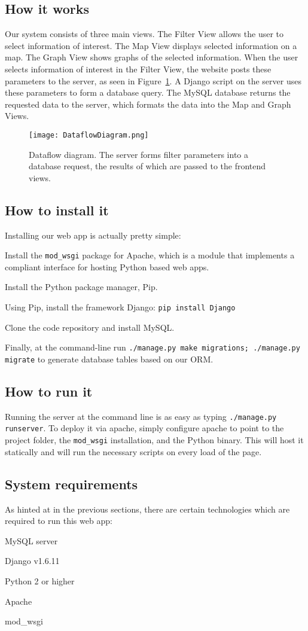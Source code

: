 \subsection{How it works}
Our system consists of three main views.
The Filter View allows the user to select information of interest.
The Map View displays selected information on a map.
The Graph View shows graphs of the selected information.
When the user selects information of interest in the Filter View, the website posts these parameters to the server, as seen in Figure~\ref{fig:dataflow}.
A Django script on the server uses these parameters to form a database query.
The MySQL database returns the requested data to the server, which formats the data into the Map and Graph Views.

\begin{figure}[h]
\centering
\texttt{[image: DataflowDiagram.png]}
\captionsetup{justification=centering}
\caption{
  Dataflow diagram.
  The server forms filter parameters into a database request, the results of which are passed to the frontend views.
}
\label{fig:dataflow}
\end{figure}

\subsection{How to install it}
Installing our web app is actually pretty simple:
\begin{list}{-}{}
\item Install the \texttt{mod\_wsgi} package for Apache, which is a module that implements a compliant interface for hosting Python based web apps.
\item Install the Python package manager, Pip.
\item Using Pip, install the framework Django: \texttt{pip install Django}
\item Clone the code repository and install MySQL.
\item Finally, at the command-line run \texttt{./manage.py make migrations; ./manage.py migrate} to generate database tables based on our ORM.
\end{list}

\subsection{How to run it}
Running the server at the command line is as easy as typing \texttt{./manage.py runserver}.
To deploy it via apache, simply configure apache to point to the project folder, the \texttt{mod\_wsgi} installation, and the Python binary.
This will host it statically and will run the necessary scripts on every load of the page.

\subsection{System requirements}
As hinted at in the previous sections, there are certain technologies which are required to run this web app:
\begin{list}{-}{}
\item MySQL server
\item Django v1.6.11
\item Python 2 or higher
\item Apache
\item mod\_wsgi
\end{list}
